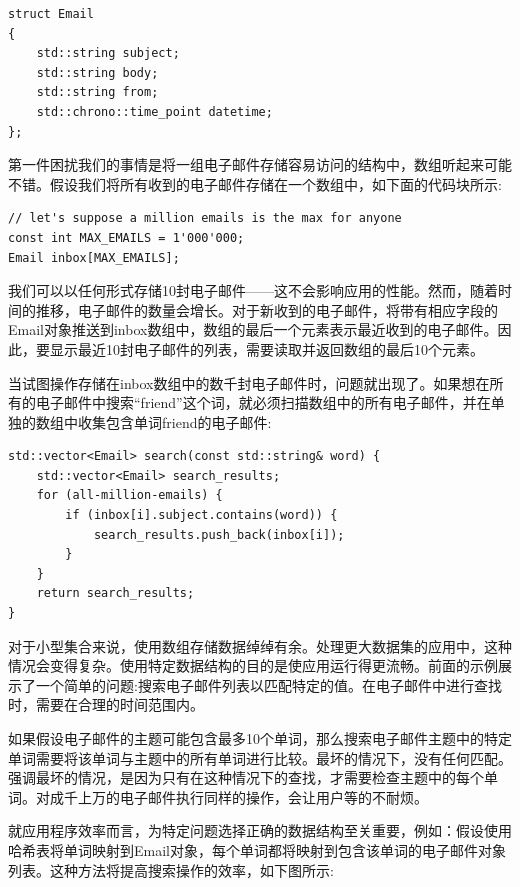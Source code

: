 \begin{lstlisting}[caption={}]
struct Email
{
	std::string subject;
	std::string body;
	std::string from;
	std::chrono::time_point datetime;
};
\end{lstlisting}

第一件困扰我们的事情是将一组电子邮件存储容易访问的结构中，数组听起来可能不错。假设我们将所有收到的电子邮件存储在一个数组中，如下面的代码块所示: \par

\begin{lstlisting}[caption={}]
// let's suppose a million emails is the max for anyone
const int MAX_EMAILS = 1'000'000;
Email inbox[MAX_EMAILS];
\end{lstlisting}

我们可以以任何形式存储10封电子邮件——这不会影响应用的性能。然而，随着时间的推移，电子邮件的数量会增长。对于新收到的电子邮件，将带有相应字段的Email对象推送到inbox数组中，数组的最后一个元素表示最近收到的电子邮件。因此，要显示最近10封电子邮件的列表，需要读取并返回数组的最后10个元素。 \par
当试图操作存储在inbox数组中的数千封电子邮件时，问题就出现了。如果想在所有的电子邮件中搜索“friend”这个词，就必须扫描数组中的所有电子邮件，并在单独的数组中收集包含单词friend的电子邮件: \par

\begin{lstlisting}[caption={}]
std::vector<Email> search(const std::string& word) {
	std::vector<Email> search_results;
	for (all-million-emails) {
		if (inbox[i].subject.contains(word)) {
			search_results.push_back(inbox[i]);
		}
	}
	return search_results;
}
\end{lstlisting}

对于小型集合来说，使用数组存储数据绰绰有余。处理更大数据集的应用中，这种情况会变得复杂。使用特定数据结构的目的是使应用运行得更流畅。前面的示例展示了一个简单的问题:搜索电子邮件列表以匹配特定的值。在电子邮件中进行查找时，需要在合理的时间范围内。 \par
如果假设电子邮件的主题可能包含最多10个单词，那么搜索电子邮件主题中的特定单词需要将该单词与主题中的所有单词进行比较。最坏的情况下，没有任何匹配。强调最坏的情况，是因为只有在这种情况下的查找，才需要检查主题中的每个单词。对成千上万的电子邮件执行同样的操作，会让用户等的不耐烦。 \par
就应用程序效率而言，为特定问题选择正确的数据结构至关重要，例如：假设使用哈希表将单词映射到Email对象，每个单词都将映射到包含该单词的电子邮件对象列表。这种方法将提高搜索操作的效率，如下图所示:\par

